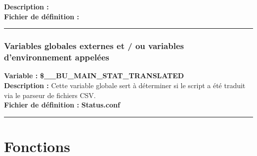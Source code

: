 \documentclass[a4paper,10pt]{article}
\begin{document}
\textbf{Description :} \\[1\baselineskip]

\textbf{Fichier de définition :} \textbf{\color{lime}\color{white}}\\[1\baselineskip]



\color{blue}\par\noindent\rule{\textwidth}{0.4pt}\color{white}

\color{blue}
\subsubsection{Variables globales externes et / ou variables d'environnement appelées}\color{white}
\textbf{Variable :} \textbf{\color{orange}\$\_\_BU\_MAIN\_STAT\_TRANSLATED\color{white}}\\[1\baselineskip]

\textbf{Description :} Cette variable globale sert à déterminer si le script a été traduit via le parseur de fichiers CSV.\\[1\baselineskip]

\textbf{Fichier de définition :} \textbf{\color{lime}Status.conf\color{white}}\\[1\baselineskip]



\color{red}\par\noindent\rule{\textwidth}{0.4pt}\color{white}

\color{red}
\section{Fonctions}\color{white}

\color{green}
\subsection{}\color{white}
\end{document}
